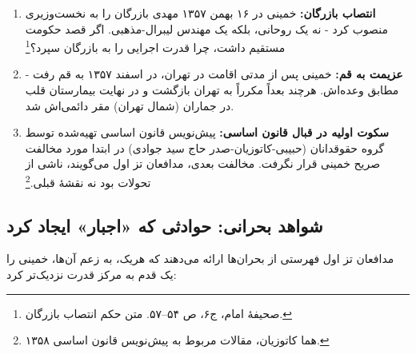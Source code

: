 \documentclass[12pt,a4paper]{book}
\begin{document}
\begin{enumerate}[label=\textcolor{cGreen}{\bfseries شاهد \arabic*:}, rightmargin=2em]
    \item \textbf{انتصاب بازرگان:} خمینی در ۱۶ بهمن ۱۳۵۷ مهدی بازرگان را به نخست‌وزیری منصوب کرد - نه یک روحانی، بلکه یک مهندس لیبرال-مذهبی. اگر قصد حکومت مستقیم داشت، چرا قدرت اجرایی را به بازرگان سپرد؟\footnote{صحیفهٔ امام، ج۶، ص ۵۴–۵۷. متن حکم انتصاب بازرگان.}

    \item \textbf{عزیمت به قم:} خمینی پس از مدتی اقامت در تهران، در اسفند ۱۳۵۷ به قم رفت - مطابق وعده‌اش. هرچند بعداً مکرراً به تهران بازگشت و در نهایت بیمارستان قلب در جماران (شمال تهران) مقر دائمی‌اش شد.

    \item \textbf{سکوت اولیه در قبال قانون اساسی:} پیش‌نویس قانون اساسی تهیه‌شده توسط گروه حقوقدانان (حبیبی-کاتوزیان-صدر حاج سید جوادی) در ابتدا مورد مخالفت صریح خمینی قرار نگرفت. مخالفت بعدی، مدافعان تز اول می‌گویند، ناشی از تحولات بود نه نقشهٔ قبلی.\footnote{هما کاتوزیان، مقالات مربوط به پیش‌نویس قانون اساسی ۱۳۵۸.}
\end{enumerate}

\subsection{شواهد بحرانی: حوادثی که «اجبار» ایجاد کرد}

مدافعان تز اول فهرستی از بحران‌ها ارائه می‌دهند که هر‌یک، به زعم آن‌ها، خمینی را یک قدم به مرکز قدرت نزدیک‌تر کرد:
\end{document}
